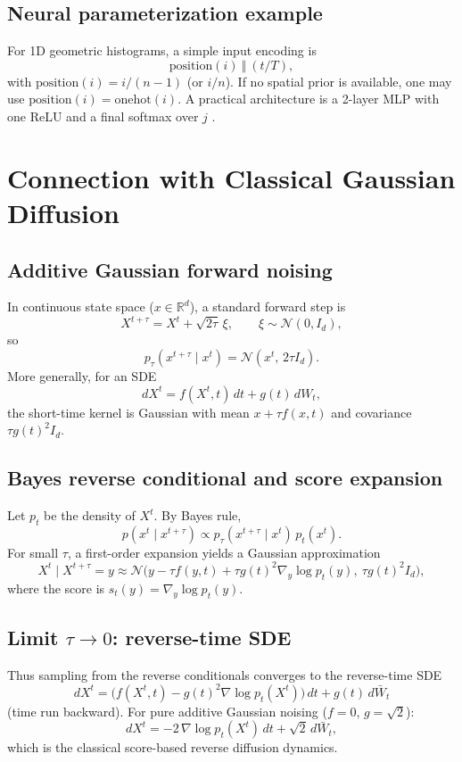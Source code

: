 \documentclass[11pt]{article}
\begin{document}
\subsection{Neural parameterization example}
For 1D geometric histograms, a simple input encoding is
\[
\mathrm{position}(i)\ \Vert\ (t/T),
\]
with $\mathrm{position}(i)=i/(n-1)$ (or $i/n$). If no spatial prior is available, one may use $\mathrm{position}(i)=\mathrm{onehot}(i)$.
A practical architecture is a 2-layer MLP with one ReLU and a final softmax over $j$
\citep{austin2021structured,campbell2022continuous,pauline2025foundations}.


\section{Connection with Classical Gaussian Diffusion}
\subsection{Additive Gaussian forward noising}
In continuous state space ($x\in\mathbb R^d$), a standard forward step is
\[
X^{t+\tau}=X^t+\sqrt{2\tau}\,\xi,\qquad \xi\sim\mathcal N(0,I_d),
\]
so
\[
p_\tau(x^{t+\tau}\mid x^t)=\mathcal N(x^t,\,2\tau I_d).
\]
More generally, for an SDE
\[
dX^t=f(X^t,t)\,dt+g(t)\,dW_t,
\]
the short-time kernel is Gaussian with mean $x+\tau f(x,t)$ and covariance $\tau g(t)^2 I_d$.

\subsection{Bayes reverse conditional and score expansion}
Let $p_t$ be the density of $X^t$. By Bayes rule,
\[
p(x^t\mid x^{t+\tau})
\propto
p_\tau(x^{t+\tau}\mid x^t)\,p_t(x^t).
\]
For small $\tau$, a first-order expansion yields a Gaussian approximation
\[
X^t\mid X^{t+\tau}=y
\approx
\mathcal N\!\Big(y-\tau f(y,t)+\tau g(t)^2\nabla_y\log p_t(y),\ \tau g(t)^2 I_d\Big),
\]
where the score is $s_t(y)=\nabla_y\log p_t(y)$.

\subsection{Limit $\tau\to 0$: reverse-time SDE}
Thus sampling from the reverse conditionals converges to the reverse-time SDE
\[
dX^t=\big(f(X^t,t)-g(t)^2\nabla\log p_t(X^t)\big)\,dt+g(t)\,d\bar W_t
\]
(time run backward).
For pure additive Gaussian noising ($f=0$, $g=\sqrt2$):
\[
dX^t=-2\,\nabla\log p_t(X^t)\,dt+\sqrt2\,d\bar W_t,
\]
which is the classical score-based reverse diffusion dynamics.
\end{document}
